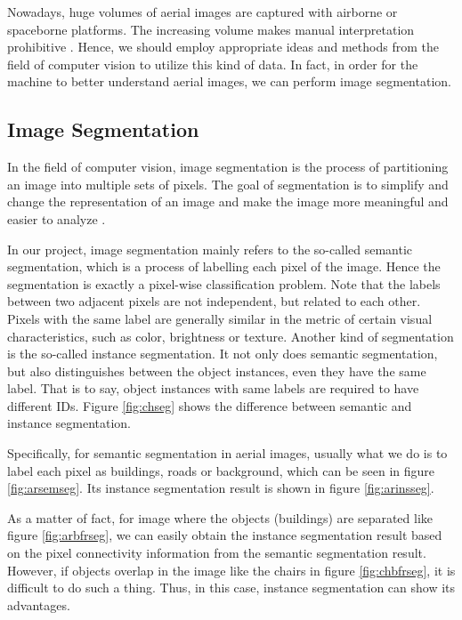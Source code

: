 

Nowadays, huge volumes of aerial images are captured with airborne or spaceborne platforms. The increasing volume makes manual interpretation prohibitive \cite{mspascal}. Hence, we should employ appropriate ideas and methods from the field of computer vision to utilize this kind of data. In fact, in order for the machine to better understand aerial images, we can perform image segmentation.

\subsection{Image Segmentation}\label{imgseg}
In the field of computer vision, image segmentation is the process of partitioning an image into multiple sets of pixels. The goal of segmentation is to simplify and change the representation of an image and make the image more meaningful and easier to analyze \cite{cvbookstockman}.

In our project, image segmentation mainly refers to the so-called semantic segmentation, which is a process of labelling each pixel of the image. Hence the segmentation is exactly a pixel-wise classification problem. Note that the labels between two adjacent pixels are not independent, but related to each other. Pixels with the same label are generally similar in the metric of certain visual characteristics, such as color, brightness or texture. Another kind of segmentation is the so-called instance segmentation. It not only does semantic segmentation, but also distinguishes between the object instances, even they have the same label. That is to say, object instances with same labels are required to have different IDs. Figure \ref{fig:chseg} shows the difference between semantic and instance segmentation.



Specifically, for semantic segmentation in aerial images, usually what we do is to label each pixel as buildings, roads or background, which can be seen in figure \ref{fig:arsemseg}. Its instance segmentation result is shown in figure \ref{fig:arinsseg}.



As a matter of fact, for image where the objects (buildings) are separated like figure \ref{fig:arbfrseg}, we can easily obtain the instance segmentation result based on the pixel connectivity information from the semantic segmentation result. However, if objects overlap in the image like the chairs in figure \ref{fig:chbfrseg}, it is difficult to do such a thing. Thus, in this case, instance segmentation can show its advantages.

